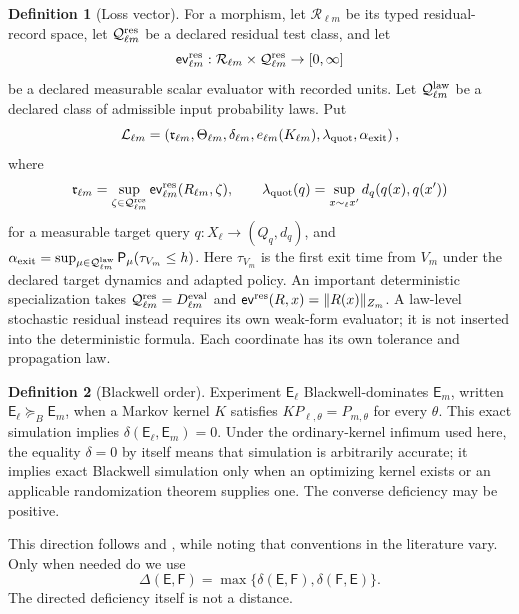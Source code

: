 \documentclass[11pt,a4paper]{article}
\theoremstyle{definition}
\newtheorem{definition}{Definition}[section]
\theoremstyle{plain}
\theoremstyle{remark}
\newcommand{\Prob}{\mathsf P}
\begin{document}
\begin{definition}[Loss vector]\label{def:lossvector}
For a morphism, let \(\mathcal R_{\ell m}\) be its typed residual-record
space, let \(\mathcal Q_{\ell m}^{\rm res}\) be a declared residual test class,
and let
\[
\mathsf{ev}_{\ell m}^{\rm res}:
\mathcal R_{\ell m}\times\mathcal Q_{\ell m}^{\rm res}
\to[0,\infty]
\]
be a declared measurable scalar evaluator with recorded units.  Let
\(\mathcal Q_{\ell m}^{\rm law}\) be a declared class of admissible input
probability laws.  Put
\[
\mathcal L_{\ell m}=
\left(
\mathfrak r_{\ell m},
\Theta_{\ell m},
\delta_{\ell m},
e_{\ell m}(K_{\ell m}),
\lambda_{\rm quot},
\alpha_{\rm exit}
\right),
\]
where
\[
\mathfrak r_{\ell m}
=\sup_{\zeta\in\mathcal Q_{\ell m}^{\rm res}}
\mathsf{ev}_{\ell m}^{\rm res}(R_{\ell m},\zeta),
\qquad
\lambda_{\rm quot}(q)
=\sup_{x\sim_\ell x'}d_q(q(x),q(x'))
\]
for a measurable target query \(q:X_\ell\to(Q_q,d_q)\), and
\(\alpha_{\rm exit}=\sup_{\mu\in\mathcal Q_{\ell m}^{\rm law}}
\Prob_\mu(\tau_{V_m}\le h)\).  Here \(\tau_{V_m}\) is the first exit time
from \(V_m\) under the declared target dynamics and adapted policy.  An
important deterministic specialization takes
\(\mathcal Q_{\ell m}^{\rm res}=D_{\ell m}^{\rm eval}\) and
\(\mathsf{ev}^{\rm res}(R,x)=\|R(x)\|_{Z_m}\).  A law-level stochastic
residual instead requires its own weak-form evaluator; it is not inserted into
the deterministic formula.  Each coordinate has its own tolerance and
propagation law.
\end{definition}

\begin{definition}[Blackwell order]\label{def:blackwell}
Experiment \(\mathsf E_\ell\) Blackwell-dominates \(\mathsf E_m\), written
\(\mathsf E_\ell\succeq_B\mathsf E_m\), when a Markov kernel \(K\) satisfies
\(K P_{\ell,\theta}=P_{m,\theta}\) for every \(\theta\).  This exact
simulation implies \(\delta(\mathsf E_\ell,\mathsf E_m)=0\).  Under the
ordinary-kernel infimum used here, the equality \(\delta=0\) by itself means
that simulation is arbitrarily accurate; it implies exact Blackwell
simulation only when an optimizing kernel exists or an applicable
randomization theorem supplies one.  The converse deficiency may be positive.
\end{definition}

This direction follows \citet{blackwell1953} and \citet{lecam1964}, while
noting that conventions in the literature vary.  Only when needed do we use
\[
\Delta(\mathsf E,\mathsf F)
=\max\{\delta(\mathsf E,\mathsf F),\delta(\mathsf F,\mathsf E)\}.
\]
The directed deficiency itself is not a distance.
\end{document}
